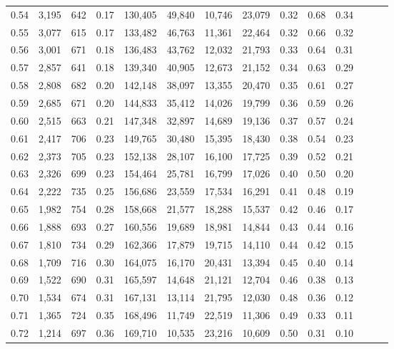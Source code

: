 \begin{tabular}{rrrrrrrrrrrrrr}
0.54 &  3,195 &  642 &  0.17 &  130,405 &   49,840 &  10,746 &  23,079 &  0.32 &  0.68 &      0.34 \\
0.55 &  3,077 &  615 &  0.17 &  133,482 &   46,763 &  11,361 &  22,464 &  0.32 &  0.66 &      0.32 \\
0.56 &  3,001 &  671 &  0.18 &  136,483 &   43,762 &  12,032 &  21,793 &  0.33 &  0.64 &      0.31 \\
0.57 &  2,857 &  641 &  0.18 &  139,340 &   40,905 &  12,673 &  21,152 &  0.34 &  0.63 &      0.29 \\
0.58 &  2,808 &  682 &  0.20 &  142,148 &   38,097 &  13,355 &  20,470 &  0.35 &  0.61 &      0.27 \\
0.59 &  2,685 &  671 &  0.20 &  144,833 &   35,412 &  14,026 &  19,799 &  0.36 &  0.59 &      0.26 \\
0.60 &  2,515 &  663 &  0.21 &  147,348 &   32,897 &  14,689 &  19,136 &  0.37 &  0.57 &      0.24 \\
0.61 &  2,417 &  706 &  0.23 &  149,765 &   30,480 &  15,395 &  18,430 &  0.38 &  0.54 &      0.23 \\
0.62 &  2,373 &  705 &  0.23 &  152,138 &   28,107 &  16,100 &  17,725 &  0.39 &  0.52 &      0.21 \\
0.63 &  2,326 &  699 &  0.23 &  154,464 &   25,781 &  16,799 &  17,026 &  0.40 &  0.50 &      0.20 \\
0.64 &  2,222 &  735 &  0.25 &  156,686 &   23,559 &  17,534 &  16,291 &  0.41 &  0.48 &      0.19 \\
0.65 &  1,982 &  754 &  0.28 &  158,668 &   21,577 &  18,288 &  15,537 &  0.42 &  0.46 &      0.17 \\
0.66 &  1,888 &  693 &  0.27 &  160,556 &   19,689 &  18,981 &  14,844 &  0.43 &  0.44 &      0.16 \\
0.67 &  1,810 &  734 &  0.29 &  162,366 &   17,879 &  19,715 &  14,110 &  0.44 &  0.42 &      0.15 \\
0.68 &  1,709 &  716 &  0.30 &  164,075 &   16,170 &  20,431 &  13,394 &  0.45 &  0.40 &      0.14 \\
0.69 &  1,522 &  690 &  0.31 &  165,597 &   14,648 &  21,121 &  12,704 &  0.46 &  0.38 &      0.13 \\
0.70 &  1,534 &  674 &  0.31 &  167,131 &   13,114 &  21,795 &  12,030 &  0.48 &  0.36 &      0.12 \\
0.71 &  1,365 &  724 &  0.35 &  168,496 &   11,749 &  22,519 &  11,306 &  0.49 &  0.33 &      0.11 \\
0.72 &  1,214 &  697 &  0.36 &  169,710 &   10,535 &  23,216 &  10,609 &  0.50 &  0.31 &      0.10 \\

\end{tabular}
